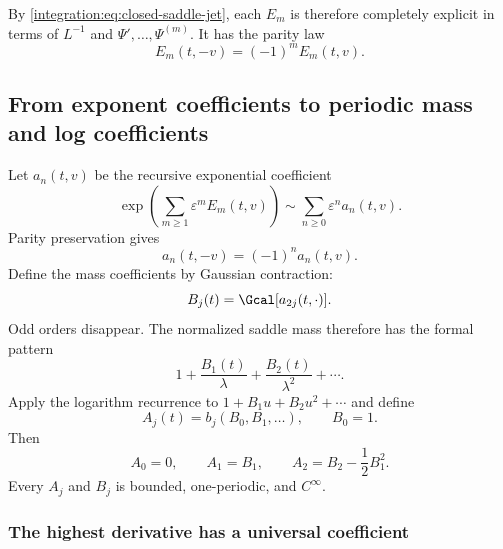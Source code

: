 \documentclass[11pt,oneside]{article}
\theoremstyle{definition}
\theoremstyle{remark}
\begin{document}
By \eqref{integration:eq:closed-saddle-jet}, each $E_m$ is therefore completely explicit in terms of
$L^{-1}$ and $\Psi',\ldots,\Psi^{(m)}$.  It has the parity law
\begin{equation}
 E_m(t,-v)=(-1)^mE_m(t,v).
 \label{integration:eq:exponent-coefficient-parity}
\end{equation}

\subsection{From exponent coefficients to periodic mass and log coefficients}
\label{integration:sec:saddle-coeff-engine}

Let $a_n(t,v)$ be the recursive exponential coefficient
\begin{equation}
 \exp\!\left(\sum_{m\ge1}\varepsilon^mE_m(t,v)\right)
 \sim\sum_{n\ge0}\varepsilon^na_n(t,v).
 \label{integration:eq:saddle-exp-formal}
\end{equation}
Parity preservation gives
\begin{equation}
 a_n(t,-v)=(-1)^na_n(t,v).
 \label{integration:eq:saddle-a-parity}
\end{equation}
Define the mass coefficients by Gaussian contraction:
\begin{equation}
 B_j(t)=\Gcal[a_{2j}(t,\cdot)].
 \label{integration:eq:saddle-mass-coefficient}
\end{equation}
Odd orders disappear.  The normalized saddle mass therefore has the formal pattern
\begin{equation}
 1+\frac{B_1(t)}{\lambda}
   +\frac{B_2(t)}{\lambda^2}+\cdots.
 \label{integration:eq:saddle-mass-pattern}
\end{equation}
Apply the logarithm recurrence to $1+B_1u+B_2u^2+\cdots$ and define
\begin{equation}
 A_j(t)=b_j(B_0,B_1,\ldots),
 \qquad B_0=1.
 \label{integration:eq:saddle-log-coefficient}
\end{equation}
Then
\begin{equation}
 A_0=0,
 \qquad
 A_1=B_1,
 \qquad
 A_2=B_2-\frac12B_1^2.
 \label{integration:eq:first-log-mass-relations}
\end{equation}
Every $A_j$ and $B_j$ is bounded, one-periodic, and $C^\infty$.

\subsubsection{The highest derivative has a universal coefficient}
\end{document}
